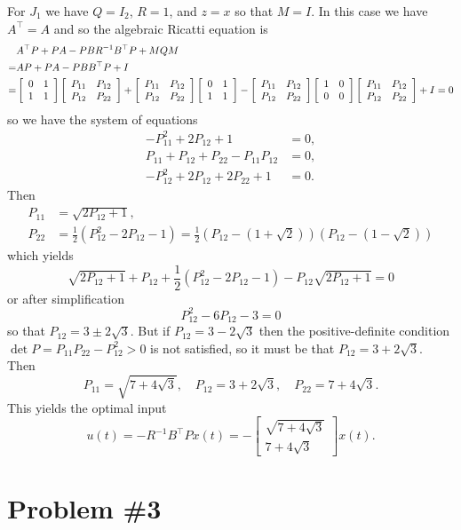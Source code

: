 \documentclass{article}
\begin{document}
For $J_1$ we have $Q = I_2$, $R = 1$, and $z = x$ so that
$M = I$. In this case we have $A^{\top} = A$ and so
the algebraic Ricatti equation is
\begin{align*}
   & A^\top P + P A - P B R^{-1} B^\top P + M Q M \\
 = & A P + P A - P B B^\top P + I \\
 = &
\left[\begin{array}{c c}
0 & 1 \\
1 & 1
\end{array}\right]
\left[\begin{array}{c c}
P_{11} & P_{12} \\
P_{12} & P_{22}
\end{array}\right]
+
\left[\begin{array}{c c}
P_{11} & P_{12} \\
P_{12} & P_{22}
\end{array}\right]
\left[\begin{array}{c c}
0 & 1 \\
1 & 1
\end{array}\right]
-
\left[\begin{array}{c c}
P_{11} & P_{12} \\
P_{12} & P_{22}
\end{array}\right]
\left[\begin{array}{c c}
1 & 0 \\
0 & 0
\end{array}\right]
\left[\begin{array}{c c}
P_{11} & P_{12} \\
P_{12} & P_{22}
\end{array}\right]
+
I = 0
\end{align*}
so we have the system of equations
\begin{align*}
  - P_{11}^2 + 2 P_{12} + 1 &= 0, \\
    P_{11}   +   P_{12} + P_{22} - P_{11} P_{12} &= 0, \\
  - P_{12}^2 + 2 P_{12} + 2 P_{22} + 1 &= 0.
\end{align*}
Then
\begin{align*}
P_{11} &= \sqrt{2 P_{12} + 1}, \\
P_{22} &= \frac{1}{2} (P_{12}^2 - 2 P_{12} - 1)
       = \frac{1}{2} (P_{12} - (1 + \sqrt{2}))(P_{12} - (1 - \sqrt{2}))
\end{align*}
which yields
$$
\sqrt{2 P_{12} + 1}
+ P_{12}
+ \frac{1}{2}(P_{12}^2 - 2P_{12} - 1)
- P_{12} \sqrt{2 P_{12} + 1} = 0
$$
or after simplification
$$
P_{12}^2 - 6P_{12} - 3 = 0
$$
so that $P_{12} = 3 \pm 2 \sqrt{3}$. But if
$P_{12} = 3 - 2\sqrt{3}$ then the positive-definite condition
$\det P = P_{11} P_{22} - P_{12}^2 > 0$ is not satisfied, so it must
be that $P_{12} = 3 + 2 \sqrt{3}$. Then
$$
P_{11} = \sqrt{7 + 4\sqrt{3}}, \quad
P_{12} = 3 + 2\sqrt{3}, \quad
P_{22} = 7 + 4\sqrt{3}.
$$
This yields the optimal input
$$
u(t)
 = -R^{-1} B^\top P x(t)
 = -\left[\begin{array}{c}
      \sqrt{7 + 4\sqrt{3}} \\
      7 + 4 \sqrt{3}
    \end{array}\right] x(t).
$$

\section*{Problem \#3}
\end{document}
